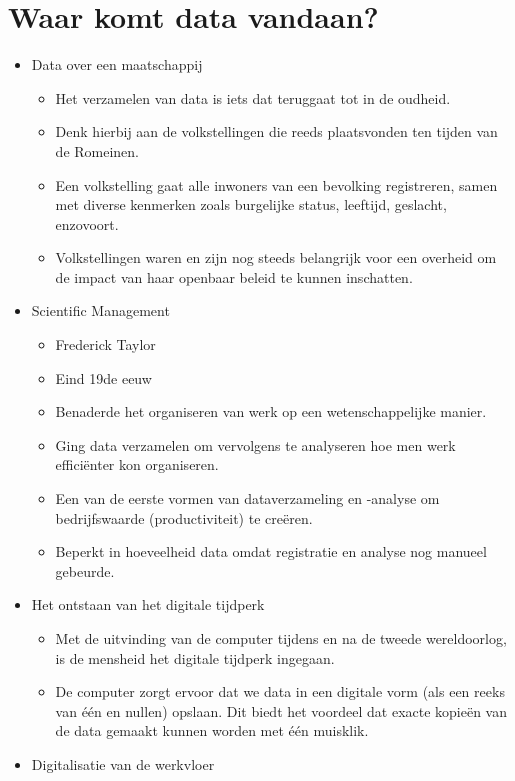 \documentclass[]{memoir}
\providecommand{\tightlist}{%
  \setlength{\itemsep}{0pt}\setlength{\parskip}{0pt}}
\begin{document}
\section{Waar komt data vandaan?}\label{waar-komt-data-vandaan}

\begin{itemize}
\tightlist
\item
  Data over een maatschappij

  \begin{itemize}
  \tightlist
  \item
    Het verzamelen van data is iets dat teruggaat tot in de oudheid.
  \item
    Denk hierbij aan de volkstellingen die reeds plaatsvonden ten tijden
    van de Romeinen.
  \item
    Een volkstelling gaat alle inwoners van een bevolking registreren,
    samen met diverse kenmerken zoals burgelijke status, leeftijd,
    geslacht, enzovoort.
  \item
    Volkstellingen waren en zijn nog steeds belangrijk voor een overheid
    om de impact van haar openbaar beleid te kunnen inschatten.
  \end{itemize}
\item
  Scientific Management

  \begin{itemize}
  \tightlist
  \item
    Frederick Taylor
  \item
    Eind 19de eeuw
  \item
    Benaderde het organiseren van werk op een wetenschappelijke manier.
  \item
    Ging data verzamelen om vervolgens te analyseren hoe men werk
    efficiënter kon organiseren.
  \item
    Een van de eerste vormen van dataverzameling en -analyse om
    bedrijfswaarde (productiviteit) te creëren.
  \item
    Beperkt in hoeveelheid data omdat registratie en analyse nog manueel
    gebeurde.
  \end{itemize}
\item
  Het ontstaan van het digitale tijdperk

  \begin{itemize}
  \tightlist
  \item
    Met de uitvinding van de computer tijdens en na de tweede
    wereldoorlog, is de mensheid het digitale tijdperk ingegaan.
  \item
    De computer zorgt ervoor dat we data in een digitale vorm (als een
    reeks van één en nullen) opslaan. Dit biedt het voordeel dat exacte
    kopieën van de data gemaakt kunnen worden met één muisklik.
  \end{itemize}
\item
  Digitalisatie van de werkvloer


\end{itemize}
\end{document}

